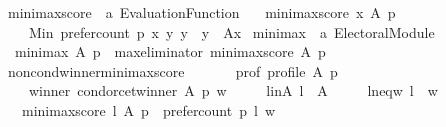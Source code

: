 \begin{isabellebody}
%
\isatagdocument
%
\isamarkuptrue%
%
\endisatagdocument
{\isafolddocument}%
%
\isadelimdocument
%
\endisadelimdocument
{}\isamarkupfalse%
\ minimax{\isacharunderscore}{\kern0pt}score\ {\isacharcolon}{\kern0pt}{\isacharcolon}{\kern0pt}\ {\isachardoublequoteopen}{\isacharprime}{\kern0pt}a\ Evaluation{\isacharunderscore}{\kern0pt}Function{\isachardoublequoteclose}\ \isanewline
\ \ {\isachardoublequoteopen}minimax{\isacharunderscore}{\kern0pt}score\ x\ A\ p\ {\isacharequal}{\kern0pt}\isanewline
\ \ \ \ Min\ {\isacharbraceleft}{\kern0pt}prefer{\isacharunderscore}{\kern0pt}count\ p\ x\ y\ {\isacharbar}{\kern0pt}y\ {\isachardot}{\kern0pt}\ y\ {\isasymin}\ A{\isacharminus}{\kern0pt}{\isacharbraceleft}{\kern0pt}x{\isacharbraceright}{\kern0pt}{\isacharbraceright}{\kern0pt}{\isachardoublequoteclose}\isanewline
\isanewline
{}\isamarkupfalse%
\ minimax\ {\isacharcolon}{\kern0pt}{\isacharcolon}{\kern0pt}\ {\isachardoublequoteopen}{\isacharprime}{\kern0pt}a\ Electoral{\isacharunderscore}{\kern0pt}Module{\isachardoublequoteclose}\ \isanewline
\ \ {\isachardoublequoteopen}minimax\ A\ p\ {\isacharequal}{\kern0pt}\ max{\isacharunderscore}{\kern0pt}eliminator\ minimax{\isacharunderscore}{\kern0pt}score\ A\ p{\isachardoublequoteclose}%
\isadelimdocument
%
\endisadelimdocument
%
\isatagdocument
%
\isamarkuptrue%
%
\endisatagdocument
{\isafolddocument}%
%
\isadelimdocument
%
\endisadelimdocument
{}\isamarkupfalse%
\ non{\isacharunderscore}{\kern0pt}cond{\isacharunderscore}{\kern0pt}winner{\isacharunderscore}{\kern0pt}minimax{\isacharunderscore}{\kern0pt}score{\isacharcolon}{\kern0pt}\isanewline
\ \ \isanewline
\ \ \ \ prof{\isacharcolon}{\kern0pt}\ {\isachardoublequoteopen}profile\ A\ p{\isachardoublequoteclose}\ \isanewline
\ \ \ \ winner{\isacharcolon}{\kern0pt}\ {\isachardoublequoteopen}condorcet{\isacharunderscore}{\kern0pt}winner\ A\ p\ w{\isachardoublequoteclose}\ \isanewline
\ \ \ \ l{\isacharunderscore}{\kern0pt}in{\isacharunderscore}{\kern0pt}A{\isacharcolon}{\kern0pt}\ {\isachardoublequoteopen}l\ {\isasymin}\ A{\isachardoublequoteclose}\ \isanewline
\ \ \ \ l{\isacharunderscore}{\kern0pt}neq{\isacharunderscore}{\kern0pt}w{\isacharcolon}{\kern0pt}\ {\isachardoublequoteopen}l\ {\isasymnoteq}\ w{\isachardoublequoteclose}\isanewline
\ \ \ {\isachardoublequoteopen}minimax{\isacharunderscore}{\kern0pt}score\ l\ A\ p\ {\isasymle}\ prefer{\isacharunderscore}{\kern0pt}count\ p\ l\ w{\isachardoublequoteclose}\isanewline

\end{isabellebody}
